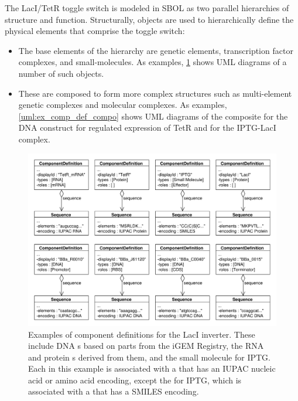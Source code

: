 The LacI/TetR toggle switch is modeled in SBOL as two parallel hierarchies of structure and function. Structurally,  objects are used to hierarchically define the physical elements that comprise the toggle switch:
\begin{itemize}
\item The base elements of the hierarchy are genetic elements, transcription factor complexes, and small-molecules.  As examples, \ref{uml:ex_comp_defs} shows UML diagrams of a number of such  objects.
\item These are composed to form more complex structures such as multi-element genetic complexes and molecular complexes. As examples, \ref{uml:ex_comp_def_compo} shows UML diagrams of the composite  for the DNA construct for regulated expression of TetR and for the IPTG-LacI complex.
\end{itemize}

\begin{figure}[ht]
\begin{center}
\includegraphics[width=\textwidth]{example_uml/toggle_1}
\caption[]{Examples of component definitions for the LacI inverter. These include DNA s based on parts from the iGEM Registry, the RNA and protein s derived from them, and the small molecule  for IPTG. Each  in this example is associated with a  that has an IUPAC nucleic acid or amino acid encoding, except the  for IPTG, which is associated with a  that has a SMILES encoding.}
\label{uml:ex_comp_defs}
\end{center}
\end{figure}

